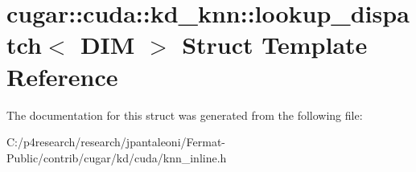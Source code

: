 \hypertarget{structcugar_1_1cuda_1_1kd__knn_1_1lookup__dispatch}{}\section{cugar\+:\+:cuda\+:\+:kd\+\_\+knn\+:\+:lookup\+\_\+dispatch$<$ D\+IM $>$ Struct Template Reference}
\label{structcugar_1_1cuda_1_1kd__knn_1_1lookup__dispatch}


The documentation for this struct was generated from the following file\+:\begin{DoxyCompactItemize}
\item 
C\+:/p4research/research/jpantaleoni/\+Fermat-\/\+Public/contrib/cugar/kd/cuda/knn\+\_\+inline.\+h\end{DoxyCompactItemize}
